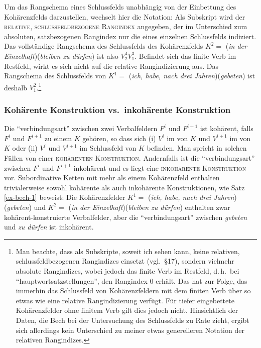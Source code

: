 Um das Rangschema eines Schlussfelds unabhängig von der Einbettung des Kohärenzfelds darzustellen, wechselt hier die Notation: Als Subskript wird der \textsc{relative, schlussfeldbezogene Rangindex} angegeben, der im Unterschied zum absoluten, satzbezogenen Rangindex nur die  eines einzelnen Schlussfelds indiziert. Das vollständige Rangschema des Schlussfelds des Kohärenzfelds $K^2 =$  ({\it in der Einzelhaft})({\it bleiben zu dürfen}) ist also $V^4_2 V^3_1$. Befindet sich das finite Verb im Restfeld, wirkt es sich nicht auf die relative Rangindizierung aus. Das Rangschema des Schlussfelds von $K^1 =$ ({\it ich, habe, nach drei Jahren})({\it gebeten}) ist deshalb $V^2_1$.\footnote{Man beachte, dass \cite{Bech:55} als Subskripte, soweit ich sehen kann, keine relativen, schlussfeldbezogenen Rangindizes einsetzt (vgl.\ \S 17), sondern vielmehr absolute Rangindizes, wobei jedoch das finite Verb im Restfeld, d.\,h.\ bei "`hauptwortsatzstellungen"', den Rangindex 0 erhält. Das hat zur Folge, das immerhin das Schlussfeld von Kohärenzfeldern mit dem finiten Verb über so etwas wie eine relative Rangindizierung verfügt. Für tiefer eingebettete Kohärenzfelder ohne finitem Verb gilt dies jedoch nicht. Hinsichtlich der Daten, die Bech bei der Untersuchung des Schlussfelds zu Rate zieht, ergibt sich allerdings kein Unterschied zu meiner etwas generelleren Notation der relativen Rangindizes.}     




\subsubsection*{Kohärente Konstruktion vs.\ inkohärente Konstruktion}

Die "`verbindungsart"' \citep[\S 71]{Bech:55} zwischen zwei Verbalfeldern $F^i$ und $F^{i+1}$ ist kohärent, falls $F^i$ und $F^{i+1}$ zu einem  $K$ gehören, so dass sich (i) $V^i$ im  von $K$ und $V^{i+1}$ im  von $K$ oder (ii) $V^i$ und $V^{i+1}$ im Schlussfeld von $K$ befinden. Man spricht in solchen Fällen von einer \textsc{kohärenten Konstruktion}. Andernfalls ist die "`verbindungsart"' zwischen $F^i$ und $F^{i+1}$ inkohärent und es liegt eine \textsc{inkohärente Konstruktion} vor. Subordinative Ketten mit mehr als einem Kohärenzfeld enthalten trivialerweise sowohl kohärente als auch inkohärente Konstruktionen, wie Satz \ref{ex-bech-1} beweist: Die Kohärenzfelder $K^1 =$ ({\it ich, habe, nach drei Jahren})({\it gebeten}) und $K^2 =$  ({\it in der Einzelhaft})({\it bleiben zu dürfen}) enthalten zwar kohärent-konstruierte Verbalfelder, aber die "`verbindungsart"' zwischen {\it gebeten} und {\it zu dürfen} ist inkohärent.

